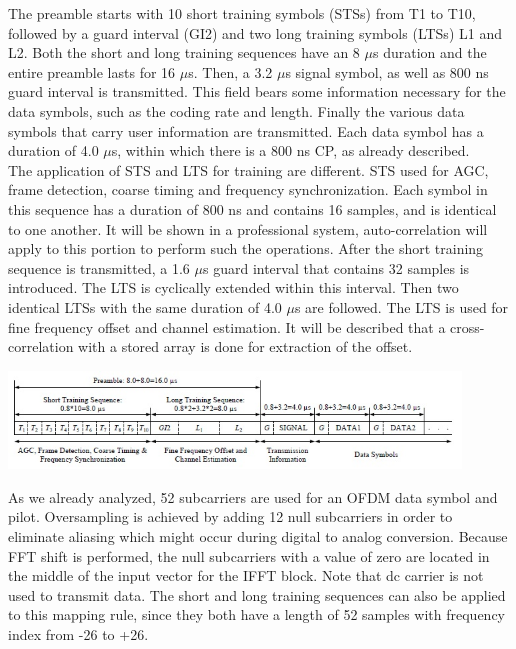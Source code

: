 The preamble starts with 10 short training symbols (STSs) from T1 to T10, followed by a guard interval (GI2) and two long training symbols (LTSs) L1 and L2. Both the short and long training sequences have an 8 $\mu$s duration and the entire preamble lasts for 16 $\mu$s. Then, a 3.2 $\mu$s signal symbol, as well as 800 ns guard interval is transmitted. This field bears some information necessary for the data symbols, such as the coding rate and length. Finally the various data symbols that carry user information are transmitted. Each data symbol has a duration of 4.0 $\mu$s, within which there is a 800 ns CP, as already described.\\
The application of STS and LTS for training are different. STS used for AGC, frame detection, coarse timing and frequency synchronization. Each symbol in this sequence has a duration of 800 ns and contains 16 samples, and is identical to one another.
 It will be shown in a professional system, auto-correlation will apply to this portion to perform such the operations. After the short training sequence is transmitted, a 1.6 $\mu$s guard interval that contains 32 samples is introduced. The LTS is cyclically extended within this interval. Then two identical LTSs with the same duration of 4.0 $\mu$s are followed. The LTS is used for fine frequency offset and channel estimation. It will be described that a cross-correlation with a stored array is done for extraction of the offset.\\



\begin{center}
\includegraphics[width=12cm]{content/fig/ofdm_frame.JPG}
\end{center}

As we already analyzed, 52 subcarriers are used for an OFDM data symbol and pilot. Oversampling is achieved by adding 12 null subcarriers in order to eliminate aliasing which might occur during digital to analog conversion. Because FFT shift is performed, the null subcarriers with a value of zero are located in the middle of the input vector for the IFFT block. Note that dc carrier is not used to transmit data. The short and long training sequences can also be applied to this mapping rule, since they both have a length of 52 samples with frequency index from -26 to +26.\\



